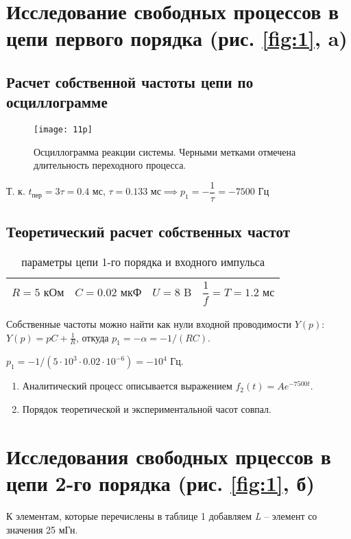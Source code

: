 \documentclass[a4paper,14pt ]{article} %
\begin{document}
\section{Исследование свободных процессов в цепи первого порядка (рис. \ref{fig:1}, a)}
\subsection{Расчет собственной частоты цепи по осциллограмме}
\begin{figure}[H]
    \texttt{[image: 11p]}
    \centering
    \caption{\centering Осциллограмма реакции системы. Черными метками отмечена длительность
    переходного процесса.}
\end{figure} Т. к. $t_\text{пер} = 3\tau = 0.4 \text{ мс}$, $\tau = 0.133\text{ мс}
\implies p_1 = -\dfrac{1}{\tau} = -7500\text{ Гц}$
\subsection{Теоретический расчет собственных частот}
\begin{table}[h]
    \centering
    \begin{tabular}{|r|c|c|l|}
        \hline
        $R = 5 \text{ кОм}$ & $C = 0.02 \text{ мкФ} $ & $ U = 8 \text{ B}$ &
        $\dfrac{1}{f} = T = 1.2 \text{ мс} $ \\
        \hline
    \end{tabular}
    \caption{параметры цепи 1-го порядка и входного импульса}
\end{table}
Собственные частоты можно найти как нули входной проводимости $Y(p)$:
$ Y(p) = pC + \frac1R $, откуда $ p_1 = -\alpha = -1/(RC) $.

$p_1 = -1/(5\cdot10^3\cdot0.02\cdot10^{-6}) =  -10^{4}$ Гц.
\begin{enumerate}
    \item Аналитический процесс описывается выражением $f_2(t) = Ae^{-7500t}$.
    \item Порядок теоретической и экспериментальной часот совпал.
\end{enumerate} \newpage
\section{Исследования свободных прцессов в цепи 2-го порядка (рис. \ref{fig:1}, б)}
К элементам, которые перечислены в таблице 1 добавляем {\it L} -- элемент со значения 25 мГн.
\end{document}
